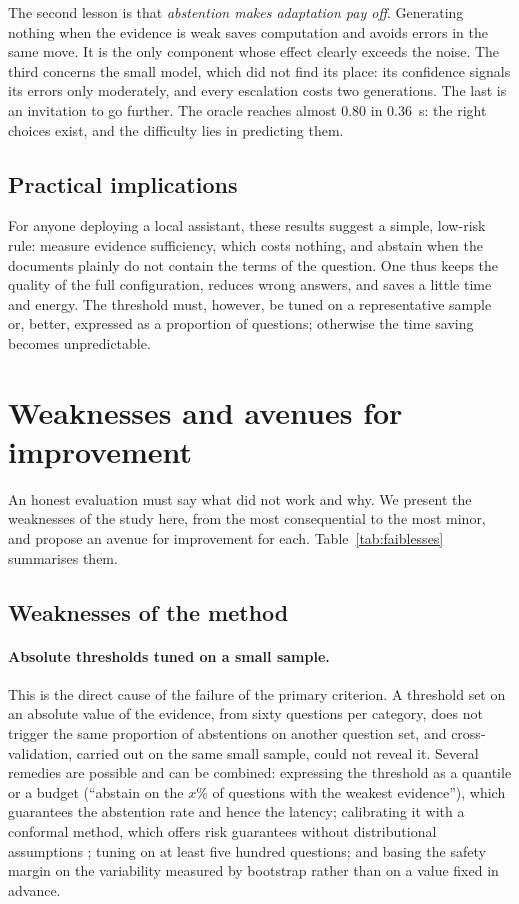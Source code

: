 \documentclass[11pt,a4paper]{article}
\begin{document}
The second lesson is that \emph{abstention makes adaptation pay off}. Generating nothing when the
evidence is weak saves computation and avoids errors in the same move. It is the only component whose
effect clearly exceeds the noise. The third concerns the small model, which did not find its place: its
confidence signals its errors only moderately, and every escalation costs two generations. The last is
an invitation to go further. The oracle reaches almost 0.80 in 0.36~s: the right choices exist, and the
difficulty lies in predicting them.

\subsection{Practical implications}

For anyone deploying a local assistant, these results suggest a simple, low-risk rule: measure evidence
sufficiency, which costs nothing, and abstain when the documents plainly do not contain the terms of the
question. One thus keeps the quality of the full configuration, reduces wrong answers, and saves a little
time and energy. The threshold must, however, be tuned on a representative sample or, better, expressed
as a proportion of questions; otherwise the time saving becomes unpredictable.

\section{Weaknesses and avenues for improvement}\label{sec:faiblesses}

An honest evaluation must say what did not work and why. We present the weaknesses of the study here,
from the most consequential to the most minor, and propose an avenue for improvement for each.
Table~\ref{tab:faiblesses} summarises them.

\subsection{Weaknesses of the method}

\paragraph{Absolute thresholds tuned on a small sample.} This is the direct cause of the failure of the
primary criterion. A threshold set on an absolute value of the evidence, from sixty questions per
category, does not trigger the same proportion of abstentions on another question set, and
cross-validation, carried out on the same small sample, could not reveal it. Several remedies are
possible and can be combined: expressing the threshold as a quantile or a budget (``abstain on the $x$\%
of questions with the weakest evidence''), which guarantees the abstention rate and hence the latency;
calibrating it with a conformal method, which offers risk guarantees without distributional assumptions
\citep{hao2026racer}; tuning on at least five hundred questions; and basing the safety margin on the
variability measured by bootstrap rather than on a value fixed in advance.
\end{document}
